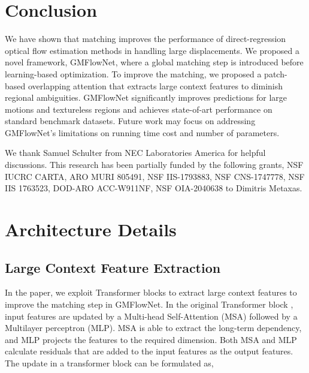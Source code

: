 \documentclass[10pt,twocolumn,letterpaper]{article}
\begin{document}
\section{Conclusion}
We have shown that matching improves the performance of  direct-regression optical flow estimation methods in handling large displacements. We proposed a novel framework, GMFlowNet, where a global matching step is introduced before learning-based optimization. To improve the matching, we proposed a patch-based overlapping attention that extracts large context features to diminish regional ambiguities.
GMFlowNet significantly improves predictions for large motions and textureless regions and achieves state-of-art performance on standard benchmark datasets. Future work may focus on addressing GMFlowNet's limitations on running time cost and number of parameters.

\vspace{1mm}
We thank Samuel Schulter from NEC Laboratories America for helpful discussions. 
This research has been partially funded by the following grants, NSF IUCRC CARTA, ARO MURI 805491, NSF IIS-1793883, NSF CNS-1747778, NSF IIS 1763523, DOD-ARO ACC-W911NF, NSF OIA-2040638 to Dimitris Metaxas.


{\small


}


\clearpage




\section{Architecture Details}
\label{sec:arch}

\subsection{Large Context Feature Extraction}

In the paper, we exploit Transformer blocks to extract large context features to improve the matching step in GMFlowNet.
In the original Transformer block \cite{vaswani2017attention}, input features are updated by a Multi-head Self-Attention (MSA) followed by a Multilayer perceptron (MLP). 
MSA is able to extract the long-term dependency, and MLP projects the features to the required dimension. 
Both MSA and MLP calculate residuals that are added to the input features as the output features. The update in a transformer block can be formulated as,
\end{document}
